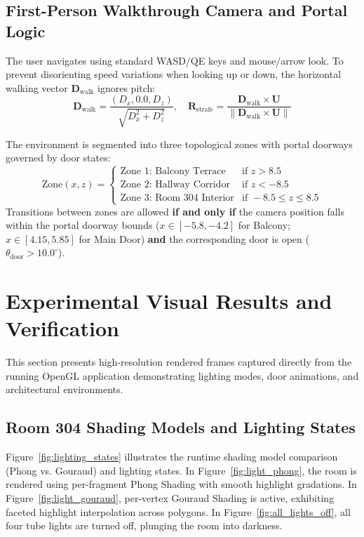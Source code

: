\documentclass[11pt,a4paper]{article}
\begin{document}
\subsection{First-Person Walkthrough Camera and Portal Logic}
The user navigates using standard WASD/QE keys and mouse/arrow look. To prevent disorienting speed variations when looking up or down, the horizontal walking vector $\mathbf{D}_{\text{walk}}$ ignores pitch:
\begin{equation}
    \mathbf{D}_{\text{walk}} = \frac{\left(D_x, 0.0, D_z\right)}{\sqrt{D_x^2 + D_z^2}}, \quad \mathbf{R}_{\text{strafe}} = \frac{\mathbf{D}_{\text{walk}} \times \mathbf{U}}{\|\mathbf{D}_{\text{walk}} \times \mathbf{U}\|}
\end{equation}

The environment is segmented into three topological zones with portal doorways governed by door states:
\begin{equation}
    \text{Zone}(x, z) = \begin{cases}
    \text{Zone 1: Balcony Terrace} & \text{if } z > 8.5 \\
    \text{Zone 2: Hallway Corridor} & \text{if } z < -8.5 \\
    \text{Zone 3: Room 304 Interior} & \text{if } -8.5 \le z \le 8.5
    \end{cases}
\end{equation}
Transitions between zones are allowed \textbf{if and only if} the camera position falls within the portal doorway bounds ($x \in [-5.8, -4.2]$ for Balcony; $x \in [4.15, 5.85]$ for Main Door) \textbf{and} the corresponding door is open ($\theta_{\text{door}} > 10.0^\circ$).




\section{Experimental Visual Results and Verification}

This section presents high-resolution rendered frames captured directly from the running OpenGL application demonstrating lighting modes, door animations, and architectural environments.

\subsection{Room 304 Shading Models and Lighting States}
Figure~\ref{fig:lighting_states} illustrates the runtime shading model comparison (Phong vs. Gouraud) and lighting states. In Figure~\ref{fig:light_phong}, the room is rendered using per-fragment Phong Shading with smooth highlight gradations. In Figure~\ref{fig:light_gouraud}, per-vertex Gouraud Shading is active, exhibiting faceted highlight interpolation across polygons. In Figure~\ref{fig:all_lights_off}, all four tube lights are turned off, plunging the room into darkness.
\end{document}
